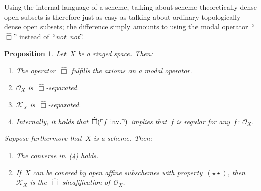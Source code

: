 \documentclass[10pt,reqno,a4paper]{amsbook}
\makeatletter
\theoremstyle{definition}
\theoremstyle{plain}
\newtheorem{prop}[defn]{Proposition}
\theoremstyle{remark}
\renewcommand{\O}{\mathcal{O}}
\newcommand{\K}{\mathcal{K}}
\newcommand{\?}{\,{:}\,}
\renewcommand{\_}{\mathpunct{.}\,}
\newcommand{\speak}[1]{\ulcorner\text{\textnormal{#1}}\urcorner}
\newcommand{\sdense}{{\widehat\Box}}
\newcommand{\inv}{inv.\@}
\newcommand{\notnot}{\emph{not~not}\xspace}
\makeatother
\begin{document}
Using the internal language of a scheme, talking about scheme-theoretically
dense open subsets is therefore just as easy as talking about ordinary
topologically dense open subsets; the difference simply amounts to using the
modal operator~``$\sdense$'' instead of~``\notnot''.

\begin{prop}\label{prop:kx-is-box-sheafification}
Let~$X$ be a ringed space. Then:
\begin{enumerate}
\item The operator~$\sdense$ fulfills the axioms on a modal operator.
\item $\O_X$ is~$\sdense$-separated.
\item $\K_X$ is~$\sdense$-separated.
\item Internally, it holds that~$\sdense(\speak{$f$ \inv})$ implies that~$f$ is
regular for any~$f\?\O_X$.
\end{enumerate}
Suppose furthermore that~$X$ is a scheme. Then:
\begin{enumerate}
\addtocounter{enumi}{4}
\item The converse in~(4) holds.
\item If~$X$ can be covered by open affine subschemes with
property~$(\star\star)$, then $\K_X$ is the~$\sdense$-sheafification of~$\O_X$.
\end{enumerate}
\end{prop}
\end{document}
